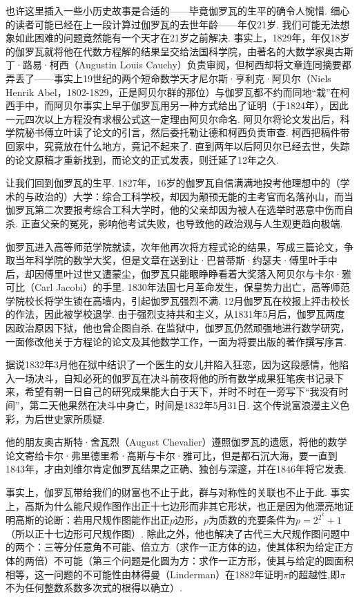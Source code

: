也许这里插入一些小历史故事是合适的——毕竟伽罗瓦的生平的确令人惋惜. 细心的读者可能已经在上一段计算过伽罗瓦的去世年龄——年仅21岁. 我们可能无法想象如此困难的问题竟然能有一个天才在21岁之前解决. 事实上，1829年，年仅18岁的伽罗瓦就将他在代数方程解的结果呈交给法国科学院，由著名的大数学家奥古斯丁·路易·柯西（Augustin Louis Cauchy）负责审阅，但柯西却将文章连同摘要都弄丢了——事实上19世纪的两个短命数学天才尼尔斯·亨利克·阿贝尔（Niels Henrik Abel，1802-1829，正是阿贝尔群的那位）与伽罗瓦都不约而同地``栽''在柯西手中，而阿贝尔事实上早于伽罗瓦用另一种方式给出了证明（于1824年），因此一元四次以上方程没有求根公式这一定理由阿贝尔命名. 阿贝尔将论文发出后，科学院秘书傅立叶读了论文的引言，然后委托勒让德和柯西负责审查. 柯西把稿件带回家中，究竟放在什么地方，竟记不起来了. 直到两年以后阿贝尔已经去世，失踪的论文原稿才重新找到，而论文的正式发表，则迁延了12年之久.

让我们回到伽罗瓦的生平. 1827年，16岁的伽罗瓦自信满满地投考他理想中的（学术的与政治的）大学：综合工科学校，却因为颟顸无能的主考官而名落孙山，而当伽罗瓦第二次要报考综合工科大学时，他的父亲却因为被人在选举时恶意中伤而自杀. 正直父亲的冤死，影响他考试失败，也导致他的政治观与人生观更趋向极端.

伽罗瓦进入高等师范学院就读，次年他再次将方程式论的结果，写成三篇论文，争取当年科学院的数学大奖，但是文章在送到让·巴普蒂斯·约瑟夫·傅里叶手中后，却因傅里叶过世又遭蒙尘，伽罗瓦只能眼睁睁看着大奖落入阿贝尔与卡尔·雅可比（Carl Jacobi）的手里. 1830年法国七月革命发生，保皇势力出亡，高等师范学院校长将学生锁在高墙内，引起伽罗瓦强烈不满. 12月伽罗瓦在校报上抨击校长的作法，因此被学校退学. 由于强烈支持共和主义，从1831年5月后，伽罗瓦两度因政治原因下狱，他也曾企图自杀. 在监狱中，伽罗瓦仍然顽强地进行数学研究，一面修改他关于方程论的论文及其他数学工作，一面为将要出版的著作撰写序言.

据说1832年3月他在狱中结识了一个医生的女儿并陷入狂恋，因为这段感情，他陷入一场决斗，自知必死的伽罗瓦在决斗前夜将他的所有数学成果狂笔疾书记录下来，希望有朝一日自己的研究成果能大白于天下，并时不时在一旁写下“我没有时间”，第二天他果然在决斗中身亡，时间是1832年5月31日. 这个传说富浪漫主义色彩，为后世史家所质疑.

他的朋友奥古斯特·舍瓦烈（August Chevalier）遵照伽罗瓦的遗愿，将他的数学论文寄给卡尔·弗里德里希·高斯与卡尔·雅可比，但是都石沉大海，要一直到1843年，才由刘维尔肯定伽罗瓦结果之正确、独创与深邃，并在1846年将它发表.

事实上，伽罗瓦带给我们的财富也不止于此，群与对称性的关联也不止于此. 事实上，高斯为什么能尺规作图作出正十七边形而非其它形状，也正是因为他漂亮地证明高斯的论断：若用尺规作图能作出正$p$边形，$p$为质数的充要条件为$p=2^{2^k}+1$（所以正十七边形可尺规作图）. 除此之外，他也解决了古代三大尺规作图问题中的两个：三等分任意角不可能、倍立方（求作一正方体的边，使其体积为给定正方体的两倍）不可能（第三个问题是化圆为方：求作一正方形，使其与给定的圆面积相等，这一问题的不可能性由林得曼（Linderman）在1882年证明$\pi$的超越性,即$\pi$不为任何整数系数多次式的根得以确立）.

